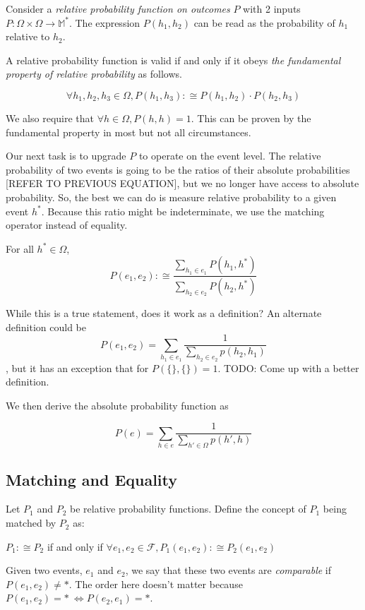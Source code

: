 \documentclass[twoside]{article}
\begin{document}
Consider a \textit{relative probability function on outcomes} \(P\) with 2 inputs \(P: \Omega \times \Omega \rightarrow \mathbb{M}^*\). The expression \(P(h_1, h_2)\) can be read as the probability of \(h_1\) relative to \(h_2\).

A relative probability function is valid if and only if it obeys \textit{the fundamental property of relative probability} as follows.

\[\forall h_1, h_2, h_3 \in \Omega, P(h_1, h_3) :\cong P(h_1, h_2) \cdot P(h_2, h_3)\]

We also require that \(\forall h \in \Omega, P(h, h) = 1\). This can be proven by the fundamental property in most but not all circumstances.

Our next task is to upgrade \(P\) to operate on the event level. The relative probability of two events is going to be the ratios of their absolute probabilities [REFER TO PREVIOUS EQUATION], but we no longer have access to absolute probability. So, the best we can do is measure relative probability to a given event \(h^*\). Because this ratio might be indeterminate, we use the matching operator instead of equality.

For all \(h^* \in \Omega\), \[P(e_1, e_2) :\cong \frac{\sum_{h_1 \in e_1} P(h_1, h^*)}{\sum_{h_2 \in e_2} P(h_2, h^*)}\]

While this is a true statement, does it work as a definition? An alternate definition could be \[P(e_1, e_2) = \sum_{h_1 \in e_1} \frac{1}{\sum_{h_2 \in e_2} p(h_2, h_1)}\], but it has an exception that for \(P(\{\},\{\}) = 1\). TODO: Come up with a better definition.

We then derive the absolute probability function as

\[P(e) = \sum_{h \in e} \frac{1}{\sum_{h' \in \Omega}p(h', h)}\]

\subsection{Matching and Equality}

Let \(P_1\) and \(P_2\) be relative probability functions. Define the concept of \(P_1\) being matched by \(P_2\) as:

\(P_1 :\cong P_2\) if and only if \(\forall e_1, e_2 \in \mathcal{F}, P_1(e_1, e_2) :\cong P_2(e_1, e_2)\)

Given two events, \(e_1\) and \(e_2\), we say that these two events are \textit{comparable} if \(P(e_1, e_2) \neq \ast\). The order here doesn't matter because \(P(e_1, e_2) = \ast\ \Leftrightarrow P(e_2, e_1) = \ast\).
\end{document}
